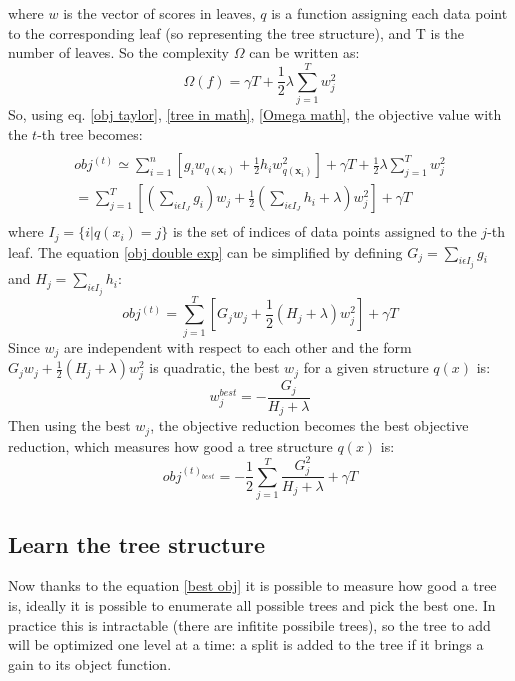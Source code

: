 \documentclass[a4paper, oneside, 11pt, openright]{book}
\begin{document}
			where $w$ is the vector of scores in leaves, $q$ is a function assigning each data point to the corresponding leaf (so representing the tree structure), and T is the number of leaves. So the complexity $\Omega$ can be written as:
			\begin{equation}
				\Omega(f) = \gamma T + \frac{1}{2} \lambda \sum_{j=1}^{T} w_j^2
				\label{Omega math}
			\end{equation}
			So, using eq. \eqref{obj taylor}, \eqref{tree in math}, \eqref{Omega math}, the objective value with the $t$-th tree becomes:
			\begin{multline}
				\\obj^{(t)} \simeq \sum_{i=1}^{n}[g_i w_{q(\textbf{x}_i)} +\frac{1}{2}h_iw_{q(\textbf{x}_i)}^2] +\gamma T + \frac{1}{2}\lambda\sum_{j=1}^{T} w_j^2\\
				=\sum_{j=1}^{T}[(\sum_{i\epsilon I_J}g_i)w_j + \frac{1}{2}(\sum_{i\epsilon I_J}h_i + \lambda)w_j^2] + \gamma T\\
				\label{obj double exp}
			\end{multline}
			where $I_j=\{i|q(x_i)=j\}$ is the set of indices of data points assigned to the $j$-th leaf. 
			The equation \eqref{obj double exp} can be simplified by defining $G_j = \sum_{i\epsilon I_j}g_i$ and $H_j = \sum_{i\epsilon I_j}h_i$:
			\begin{equation}
				obj^{(t)} =\sum_{j=1}^{T}[G_j w_j + \frac{1}{2}(H_j + \lambda)w_j^2] + \gamma T
				\label{obj simple}
			\end{equation}
			Since $w_j$ are independent with respect to each other and the form $G_jw_j+\frac{1}{2}(H_j+\lambda)w^2_j$ is quadratic, the best $w_j$ for a given structure $q(x)$ is:
			\begin{equation}
				w_j^{best} = -\dfrac{G_j}{H_j + \lambda}
				\label{best w_j}
			\end{equation}
			Then using the best $w_j$, the objective reduction becomes the best objective reduction, which measures how good a tree structure $q(x)$ is:
			\begin{equation}
				obj^{(t)_{best}} = -\frac{1}{2}\sum_{j=1}^{T}\dfrac{G_j^2}{H_j + \lambda} + \gamma T
				\label{best obj}
			\end{equation}
			
			\subsection{Learn the tree structure}
			Now thanks to the equation \eqref{best obj} it is possible to measure how good a tree is, ideally it is possible to enumerate all possible trees and pick the best one. In practice this is intractable (there are infitite possibile trees), so the tree to add will be optimized one level at a time: a split is added to the tree if it brings a gain to its object function.
			
\end{document}
